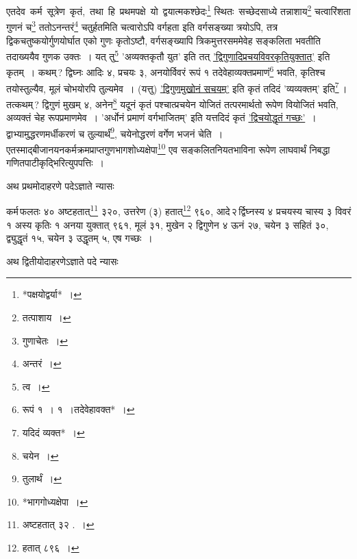 \documentclass[10pt, openany]{book}
\begin{document}
{{{{{{{एतदेव \,कर्म \,सूत्रेण \,कृतं, \,तथा \,हि \,प्रथमपक्षे \,यो \,द्वयात्मकश्छेदः\renewcommand{\thefootnote}{७}\footnote{*पक्षयोद्वर्या*~।}
स्थितः \,सच्छेदसाध्ये तन्नाशाय\renewcommand{\thefootnote}{८}\footnote{तत्पाशाय~।} चत्वारिंशता गुणनं च\renewcommand{\thefootnote}{९}\footnote{गुणाचेतः~।} ततोऽनन्तरं\renewcommand{\thefootnote}{१०}\footnote{अन्तरं~।}
चतुर्हतमिति चत्वारोऽपि वर्गहता}
{इति वर्गसङ्ख्या त्रयोऽपि, तत्र द्विकचतुष्कयोर्गुणयोर्घात एको गुणः
कृतोऽष्टौ, वर्गसङ्ख्यापि}
{त्रिकमुत्तरसममेवेह सङ्कलिता भवतीति तदाख्ययैव गुणक उक्तः~। यत् तु\renewcommand{\thefootnote}{११}\footnote{त्व~।}
{\qt 'अव्यक्तकृतौ युत'} इति तत् \hyperref[87]{'द्विगुणादिप्रचयविवरकृतियुक्तात्'} इति कृतम्~। कथम्\,?
द्विघ्नः आदिः ४, प्रचयः}
{३, अनयोर्विवरं रूपं १ तदेवेहाव्यक्तप्रमाणं\renewcommand{\thefootnote}{१२}\footnote{रूपं १~। १~।तदेवेहावक्त*~।} भवति, कृतिश्च
तयोस्तुल्यैव, मूलं चोभयोरपि}
{तुल्यमेव~। (यत्तु) \hyperref[87]{'द्विगुणमुखोनं सचयम्'} इति कृतं तदिदं
{\qt 'व्यव्यक्तम्'} इति\renewcommand{\thefootnote}{१३}\footnote{यदिदं व्यक्त*~।}\,। तत्कथम्\,?}
{द्विगुणं मुखम् ४, अनेन\renewcommand{\thefootnote}{१४}\footnote{चयेन~।}  यदूनं कृतं पश्चात्प्रचयेन योजितं
तत्परमार्थतो रूपेण वियोजितं}
{भवति, अव्यक्तं चेह रूपप्रमाणमेव~। {\qt 'अर्धोनं प्रमाणं वर्गभाजितम्'} इति
यत्तदिदं कृतं}
{\hyperref[87]{'द्विचयोद्धृतं गच्छः'}~। द्वाभ्यामुद्धरणमर्धीकरणं च तुल्यार्थं\renewcommand{\thefootnote}{१५}\footnote{तुलार्थं~।},
चयेनोद्धरणं वर्गेण भजनं चेति~।}
{एतस्माद्बीजानयनकर्मक्रमप्राप्तगुणभागशोध्यक्षेपा\renewcommand{\thefootnote}{१६}\footnote{*भागगोध्यक्षेपा~।}  एव
सङ्कलितनियतभाविना रूपेण लाघवार्थं}
{निबद्धा गणितपाटीकृद्भिरित्युपपत्तिः~।}
\vspace{3mm}

{अथ प्रथमोदाहरणे पदेऽज्ञाते न्यासः\textendash}
\vspace{2mm}

\hspace{2cm}{आ २, उ ३, गच्छो न ज्ञायते, सङ्कलितम् ४०~।}
\vspace{2mm}

{कर्म\textendash \,फलतः ४० अष्टहतात्\renewcommand{\thefootnote}{१७}\footnote{अष्टहतात्
३२ .~।}  ३२०, उत्तरेण (३) हतात्\renewcommand{\thefootnote}{१८}\footnote{हतात् ८९६~।}  ९६०,
आदे\textendash \,२\textendash \,र्द्विघ्नस्य ४}
{प्रचयस्य चास्य ३ विवरं १ अस्य कृतिः १ अनया युक्तात् ९६१, मूलं ३१, मुखेन
२ द्विगुणेन}
{४ ऊनं २७, चयेन ३ सहितं ३०, द्व्युद्धृतं १५, चयेन ३ उद्धृतम् ५, एष गच्छः~।}

\newpage

{अथ द्वितीयोदाहरणेऽज्ञाते पदे न्यासः\textemdash}
\vspace{2mm}

}}}}}}
\end{document}
